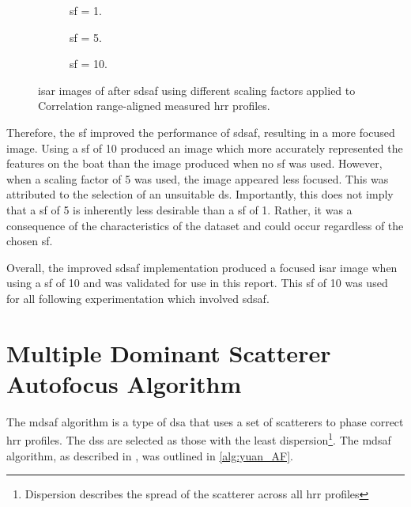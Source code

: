 \documentclass[class=report,11pt,crop=false]{standalone}
\begin{document}
    \begin{figure}[H]
        \centering
        \begin{subfigure}{0.3\linewidth}
            \resizebox{\linewidth}{!}{}
            \caption{\gls{sf} = 1. \label{subfig:hayAF_corrRA_measured_SF1}}
        \end{subfigure}
        \hspace{0.5cm}
        \begin{subfigure}{0.3\linewidth}
            \resizebox{\linewidth}{!}{}
            \caption{\gls{sf} = 5. \label{subfig:hayAF_corrRA_measured_SF5}}
        \end{subfigure}
        \hspace{0.5cm}
        \begin{subfigure}{0.3\linewidth}
            \resizebox{\linewidth}{!}{}
            \caption{\gls{sf} = 10.\label{subfig:hayAF_corrRA_measured_SF10}}
        \end{subfigure}
        \caption{\gls{isar} images of after \gls{sdsaf} using different scaling factors applied to Correlation range-aligned measured \gls{hrr} profiles.} \label{subfig:hayAF_corrRA_measured_2}
    \end{figure}

    Therefore, the \gls{sf} improved the performance of \gls{sdsaf}, resulting in a more focused image. Using a \gls{sf} of 10 produced an image which more accurately represented the features on the boat than the image produced when no \gls{sf} was used. However, when a scaling factor of 5 was used, the image appeared less focused. This was attributed to the selection of an unsuitable \gls{ds}. Importantly, this does not imply that a \gls{sf} of 5 is inherently less desirable than a \gls{sf} of 1. Rather, it was a consequence of the characteristics of the dataset and could occur regardless of the chosen \gls{sf}. 

    Overall, the improved \gls{sdsaf} implementation produced a focused \gls{isar} image when using a \gls{sf} of 10 and was validated for use in this report. This \gls{sf} of 10 was used for all following experimentation which involved \gls{sdsaf}.

\section{Multiple Dominant Scatterer Autofocus Algorithm}\label{subsec:yuanAF}
The \gls{mdsaf} algorithm is a type of \gls{dsa} that uses a set of scatterers to phase correct \gls{hrr} profiles. The \gls{ds}s are selected as those with the least dispersion\footnote{Dispersion describes the spread of the scatterer across all \gls{hrr} profiles}. The \gls{mdsaf} algorithm, as described in \cite{yuan_AF}, was outlined in \autoref{alg:yuan_AF}.
 
\end{document}
